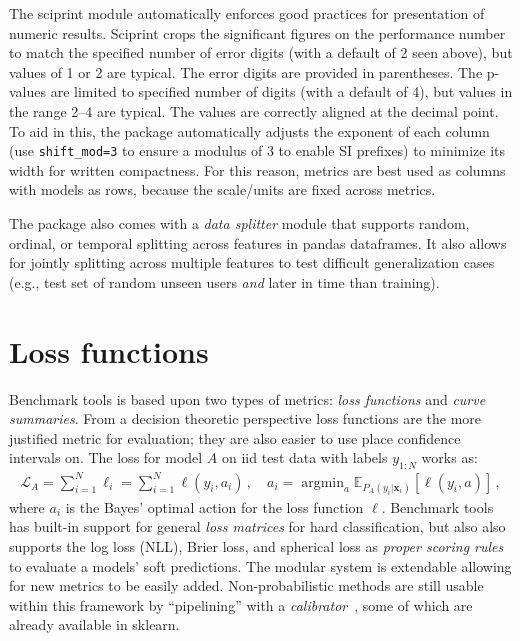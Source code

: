 \documentclass{article}
\renewcommand{\vec}[1]{{\boldsymbol{\mathbf{#1}}}} %
\newcommand{\E}{\mathbb{E}}
\newcommand{\Loss}{\mathcal{L}}
\newcommand{\loss}{\ell}
\DeclareMathOperator*{\argmin}{argmin}
\newcommand{\code}{\texttt}
\begin{document}
The sciprint module automatically enforces good practices for presentation of numeric results.
Sciprint crops the significant figures on the performance number to match the specified number of error digits (with a default of 2 seen above), but values of 1 or 2 are typical.
The error digits are provided in parentheses.
The p-values are limited to specified number of digits (with a default of 4), but values in the range 2--4 are typical.
The values are correctly aligned at the decimal point.
To aid in this, the package automatically adjusts the exponent of each column (use \code{shift\_mod=3} to ensure a modulus of 3 to enable SI prefixes) to minimize its width for written compactness.
For this reason, metrics are best used as columns with models as rows, because the scale/units are fixed across metrics.

The package also comes with a \emph{data splitter} module that supports random, ordinal, or temporal splitting across features in pandas dataframes.
It also allows for jointly splitting across multiple features to test difficult generalization cases (e.g., test set of random unseen users \emph{and} later in time than training)\@.

\section{Loss functions}

Benchmark tools is based upon two types of metrics: \emph{loss functions} and \emph{curve summaries}.
From a decision theoretic perspective loss functions are the more justified metric for evaluation; they are also easier to use place confidence intervals on.
The loss for model $A$ on iid test data with labels $y_{1:N}$ works as:
\begin{align}
  \Loss_A = \sum_{i=1}^N \loss_i = \sum_{i=1}^N \loss(y_i, a_i)\,, \quad a_i = \argmin_a \E_{P_A(y_i|\vec x_i)}[\loss(y_i, a)]\,,
\end{align}
where $a_i$ is the Bayes' optimal action for the loss function $\loss$.
Benchmark tools has built-in support for general \emph{loss matrices} for hard classification, but also also supports the log loss (NLL), Brier loss, and spherical loss as \emph{proper scoring rules}~\citep{Gneiting2007} to evaluate a models' soft predictions.
The modular system is extendable allowing for new metrics to be easily added.
Non-probabilistic methods are still usable within this framework by ``pipelining'' with a \emph{calibrator}~\citep{Kull2017,Platt1999}, some of which are already available in sklearn.
\end{document}
